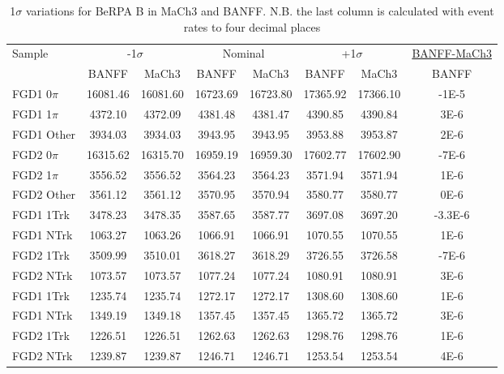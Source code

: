 \begin{table}
	\centering
\begin{tabular}{l | c c | c c | c c | c}
	\hline
	\hline
	 Sample  & \multicolumn{2}{c|}{-1$\sigma$} & \multicolumn{2}{c|}{Nominal} & \multicolumn{2}{c|}{+1$\sigma$} & \underline{BANFF-MaCh3}\\
			 &  BANFF  &  MaCh3  &  BANFF  &  MaCh3  & BANFF & MaCh3 & BANFF\\ 
	\hline
	 FGD1 0$\pi$ &  16081.46 &  16081.60 &  16723.69 &  16723.80 &  17365.92 &  17366.10 &  -1E-5 \\ 
	 FGD1 1$\pi$ &  4372.10 &  4372.09 &  4381.48 &  4381.47 &  4390.85 &  4390.84 &  3E-6 \\ 
	 FGD1 Other &  3934.03 &  3934.03 &  3943.95 &  3943.95 &  3953.88 &  3953.87 &  2E-6 \\ 
	 \hline
	 FGD2 0$\pi$ &  16315.62 &  16315.70 &  16959.19 &  16959.30 &  17602.77 &  17602.90 &  -7E-6 \\ 
	 FGD2 1$\pi$ &  3556.52 &  3556.52 &  3564.23 &  3564.23 &  3571.94 &  3571.94 &  1E-6 \\ 
	 FGD2 Other &  3561.12 &  3561.12 &  3570.95 &  3570.94 &  3580.77 &  3580.77 &  0E-6 \\ 
	 \hline
	 FGD1 1Trk &  3478.23 &  3478.35 &  3587.65 &  3587.77 &  3697.08 &  3697.20 &  -3.3E-6 \\ 
	 FGD1 NTrk &  1063.27 &  1063.26 &  1066.91 &  1066.91 &  1070.55 &  1070.55 &  1E-6 \\
	 \hline
	 FGD2 1Trk &  3509.99 &  3510.01 &  3618.27 &  3618.29 &  3726.55 &  3726.58 &  -7E-6 \\ 
	 FGD2 NTrk &  1073.57 &  1073.57 &  1077.24 &  1077.24 &  1080.91 &  1080.91 &  3E-6 \\ 
	 \hline
	 FGD1 \numu 1Trk &  1235.74 &  1235.74 &  1272.17 &  1272.17 &  1308.60 &  1308.60 &  1E-6 \\ 
	 FGD1 \numu NTrk &  1349.19 &  1349.18 &  1357.45 &  1357.45 &  1365.72 &  1365.72 &  3E-6 \\
	 \hline
	 FGD2 \numu 1Trk &  1226.51 &  1226.51 &  1262.63 &  1262.63 &  1298.76 &  1298.76 &  1E-6 \\ 
	 FGD2 \numu NTrk &  1239.87 &  1239.87 &  1246.71 &  1246.71 &  1253.54 &  1253.54 &  4E-6 \\ 
	 \hline
	 \hline
	\end{tabular}
\caption{1$\sigma$ variations for BeRPA B in MaCh3 and BANFF. N.B. the last column is calculated with event rates to four decimal places}
\label{tab:1sigmavar_banff_berpa_b}
\end{table}

